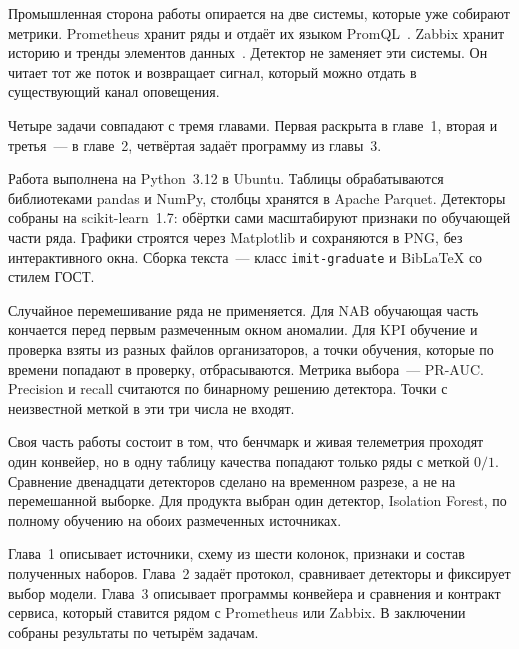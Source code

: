 Промышленная сторона работы опирается на две системы, которые уже собирают метрики.
Prometheus хранит ряды и отдаёт их языком PromQL~\cite{prometheus}.
Zabbix хранит историю и тренды элементов данных~\cite{zabbix}.
Детектор не заменяет эти системы.
Он читает тот же поток и возвращает сигнал, который можно отдать в существующий канал оповещения.

\goalandtasks

Четыре задачи совпадают с тремя главами.
Первая раскрыта в главе~1, вторая и третья~--- в главе~2, четвёртая задаёт программу из главы~3.

\tools

Работа выполнена на Python~3.12 в Ubuntu.
Таблицы обрабатываются библиотеками pandas и NumPy, столбцы хранятся в Apache Parquet.
Детекторы собраны на scikit-learn~1.7: обёртки сами масштабируют признаки по обучающей части ряда.
Графики строятся через Matplotlib и сохраняются в PNG, без интерактивного окна.
Сборка текста~--- класс \texttt{imit-graduate} и BibLaTeX со стилем ГОСТ.

Случайное перемешивание ряда не применяется.
Для NAB обучающая часть кончается перед первым размеченным окном аномалии.
Для KPI обучение и проверка взяты из разных файлов организаторов, а точки обучения, которые по времени попадают в проверку, отбрасываются.
Метрика выбора~--- PR-AUC.
Precision и recall считаются по бинарному решению детектора.
Точки с неизвестной меткой в эти три числа не входят.

\results

\originality

Своя часть работы состоит в том, что бенчмарк и живая телеметрия проходят один конвейер, но в одну таблицу качества попадают только ряды с меткой \(0/1\).
Сравнение двенадцати детекторов сделано на временном разрезе, а не на перемешанной выборке.
Для продукта выбран один детектор, Isolation Forest, по полному обучению на обоих размеченных источниках.

\structure

Глава~1 описывает источники, схему из шести колонок, признаки и состав полученных наборов.
Глава~2 задаёт протокол, сравнивает детекторы и фиксирует выбор модели.
Глава~3 описывает программы конвейера и сравнения и контракт сервиса, который ставится рядом с Prometheus или Zabbix.
В заключении собраны результаты по четырём задачам.
